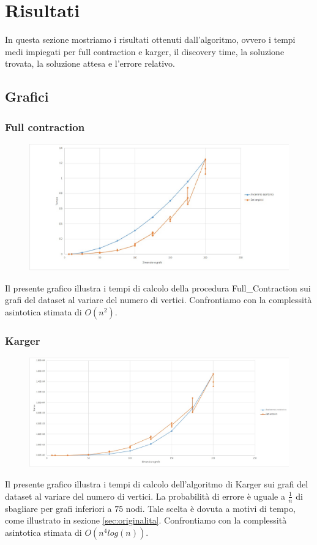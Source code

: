 \chapter{Risultati\label{sec:risultati}}
\noindent In questa sezione mostriamo i risultati ottenuti dall'algoritmo, ovvero i tempi medi impiegati per full contraction e karger, il discovery time, la soluzione trovata, la soluzione attesa e l'errore relativo.

\section{Grafici\label{sec:grafici}}

\subsection{Full contraction\label{sec:fc}}
\begin{figure}[htp]
    \centering
    \includegraphics[width=\textwidth]{immagini/full_contraction.jpg}
\end{figure}
Il presente grafico illustra i tempi di calcolo della procedura Full\_Contraction sui grafi del dataset al variare del numero di vertici. Confrontiamo con la complessità asintotica stimata di \(O(n^{2})\).

\subsection{Karger\label{sec:karger}}
\begin{figure}[htp]
    \centering
    \includegraphics[width=\textwidth]{immagini/karger.jpg}
\end{figure}
Il presente grafico illustra i tempi di calcolo dell'algoritmo di Karger sui grafi del dataset al variare del numero di vertici. La probabilità di errore è uguale a \(\frac{1}{n}\) di sbagliare per grafi inferiori a $75$ nodi. Tale scelta è dovuta a motivi di tempo, come illustrato in sezione \vref{sec:originalita}. Confrontiamo con la complessità asintotica stimata di \(O(n^{4}log(n))\).

